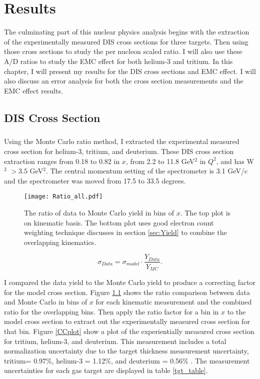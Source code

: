 
\chapter{Results}
The culminating part of this nuclear physics analysis begins with the extraction of the experimentally measured DIS cross sections for three targets. Then using those cross sections to study the per nucleon scaled ratio. I will also use these A/D ratios to study the EMC effect for both helium-3 and tritium. In this chapter, I will present my results for the DIS cross sections and EMC effect. I will also discuss an error analysis for both the cross section measurements and the EMC effect results. 
\section{DIS Cross Section}
\paragraph{}Using the Monte Carlo ratio method, I extracted the experimental measured cross section for helium-3, tritium, and deuterium. These DIS cross section extraction ranges from 0.18 to 0.82 in $x$, from 2.2 to 11.8 GeV$^2$ in $Q^2$, and has W$^2$ $>3.5$ GeV$^2$. The central momentum setting of the spectrometer is 3.1 GeV/c and the spectrometer was moved from 17.5 to 33.5 degrees.
\begin{figure}
	\caption{The ratio of data to Monte Carlo yield in bins of $x$. The top plot is on kinematic basis. The bottom plot uses good electron count weighting technique discusses in section \ref{sec:Yield} to combine the overlapping kinematics.\label{D_MC_COMP}}
	\texttt{[image: Ratio\_all.pdf]}
\end{figure}
\begin{equation}
\sigma_{Data} = \sigma_{model} \cdot \frac{Y_{Data}}{Y_{MC}}. \nonumber
\end{equation} 

I compared the data yield to the Monte Carlo yield to produce a correcting factor for the model cross section. Figure \ref{D_MC_COMP} shows the ratio comparison between data and Monte Carlo in bins of $x$ for each kinematic measurement and the combined ratio for the overlapping bins. Then apply the ratio factor for a bin in $x$ to the model cross section to extract out the experimentally measured cross section for that bin. Figure \ref{CCplot} show a plot of the experientially measured cross section for tritium, helium-3, and deuterium. This measurement includes a total normalization uncertainty due to the target thickness measurement uncertainty, tritium= 0.97\%, helium-3 = 1.12\%, and deuterium = 0.56\% \cite{HATT_eng}. The measurement uncertainties for each gas target are displayed in table \ref{tgt_table}. 

